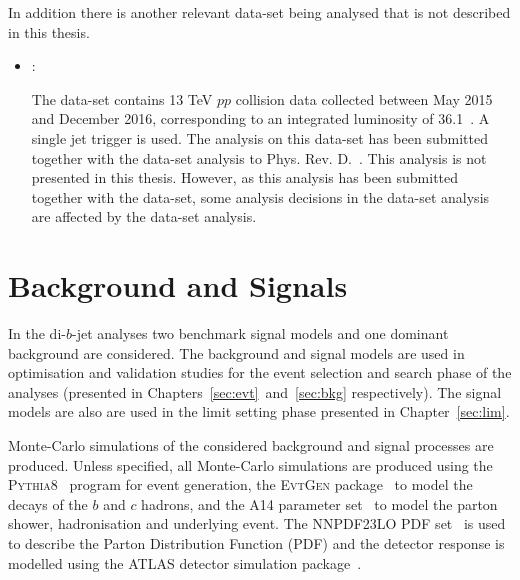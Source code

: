 \noindent
In addition there is another relevant data-set being analysed that is not described in this thesis.
\vspace{-0.5em}
\begin{itemize}[leftmargin=*]
\item\textbf{\hm{}}:

  \vspace{0.5em}
  The \hm{} data-set contains 13 TeV $pp$ collision data collected
  between May 2015 and December 2016, corresponding to an integrated luminosity of 36.1~\ifb.
  A single jet trigger is used.
  The analysis on this data-set has been submitted together with the \lm{} data-set analysis to Phys. Rev. D.~\cite{dibjet-full}.
  This analysis is not presented in this thesis.
  However, as this analysis has been submitted together with the \lm{} data-set,
  some analysis decisions in the \lm{} data-set analysis
  are affected by the \hm{} data-set analysis.

\end{itemize}
\vspace{-1em}

\section{Background and Signals}
\label{sec:evt-s+b}

In the di-$b$-jet analyses two benchmark signal models and one dominant background are considered.
The background and signal models are used in optimisation and validation studies
for the event selection and search phase of the analyses (presented in Chapters~\ref{sec:evt}~and~\ref{sec:bkg} respectively).
The signal models are also are used in the limit setting phase presented in Chapter~\ref{sec:lim}.

Monte-Carlo simulations of the considered background and signal processes are produced.
Unless specified, all Monte-Carlo simulations are produced using
the \textsc{Pythia8}~\cite{dibjet-pythia8} program for event generation,
the \textsc{EvtGen} package~\cite{trig-evtGen} to model the decays of the $b$ and $c$ hadrons,
and the A14 parameter set~\cite{dibjet-a14} to model the parton shower, hadronisation and underlying event.
The NNPDF23LO PDF set~\cite{dibjet-nnpdf} is used to describe the Parton Distribution Function (PDF) and
the detector response is modelled using the ATLAS detector simulation package~\cite{dijet-sim_ATLAS}.

